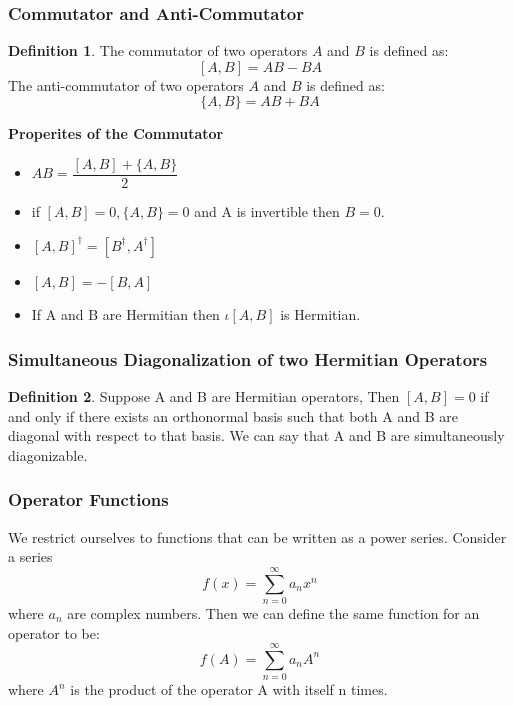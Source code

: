 \documentclass[12pt, oneside]{book}
\theoremstyle{definition}
\newtheorem{definition}{Definition}[section]
\theoremstyle{definition}
\theoremstyle{remark}
\begin{document}
\subsubsection{Commutator and Anti-Commutator}
\begin{definition}
    The commutator of two operators $A$ and $B$ is defined as:
    \[ [A,B]=AB-BA \]
    The anti-commutator of two operators $A$ and $B$ is defined as:
    \[ \{A,B\}=AB+BA \]
\end{definition}
\textbf{Properites of the Commutator}
\begin{itemize}
    \item $AB=\dfrac{[A,B]+\{A,B\}}{2}$
    \item if $[A,B]=0,\{A,B\}=0$ and A is invertible then $B=0$.
    \item $[A,B]^{\dagger}=[B^{\dagger},A^{\dagger}]$
    \item $[A,B]=-[B,A]$
    \item If A and B are Hermitian then $\iota [A,B]$ is Hermitian.
\end{itemize}

\subsubsection{Simultaneous Diagonalization of two Hermitian Operators}
\begin{definition}
    Suppose A and B are Hermitian operators, Then $[A,B]=0$ if and only if there exists an orthonormal basis
    such that both A and B are diagonal with respect to that basis. We can say that A and B are simultaneously diagonizable.    
\end{definition}

\subsubsection{Operator Functions}
We restrict ourselves to functions that can be written as a power series. Consider a series
\[ f(x)=\sum_{n=0}^{\infty} a_nx^n \]
where $a_n$ are complex numbers. Then we can define the same function for an operator to be:
\[ f(A)=\sum_{n=0}^{\infty} a_nA^n \]
where $A^n$ is the product of the operator A with itself n times.\\
\end{document}
